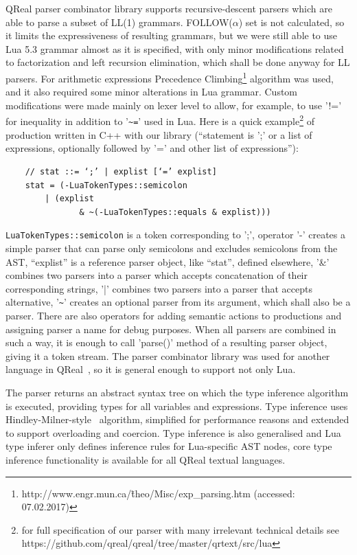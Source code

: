 \documentclass[conference]{IEEEtran}
\begin{document}
QReal parser combinator library supports recursive-descent parsers which are able to parse a subset of LL(1) grammars. FOLLOW($\alpha$) set is not calculated, so it limits the expressiveness of resulting grammars, but we were still able to use Lua 5.3 grammar almost as it is specified, with only minor modifications related to factorization and left recursion elimination, which shall be done anyway for LL parsers. For arithmetic expressions Precedence Climbing\footnote{http://www.engr.mun.ca/\~theo/Misc/exp\_parsing.htm (accessed: 07.02.2017)} algorithm was used, and it also required some minor alterations in Lua grammar. Custom modifications were made mainly on lexer level to allow, for example, to use '!=' for inequality in addition to '\verb|~=|' used in Lua. Here is a quick example\footnote{for full specification of our parser with many irrelevant technical details see https://github.com/qreal/qreal/tree/master/qrtext/src/lua} of production written in C++ with our library (``statement is ';' or a list of expressions, optionally followed by '=' and other list of expressions''):
\begin{verbatim}
	// stat ::= ‘;’ | explist [‘=’ explist]
	stat = (-LuaTokenTypes::semicolon 
	    | (explist 
			   & ~(-LuaTokenTypes::equals & explist)))
\end{verbatim}

\verb|LuaTokenTypes::semicolon| is a token corresponding to ';', operator '-' creates a simple parser that can parse only semicolons and excludes semicolons from the AST, ``explist'' is a reference parser object, like ``stat'', defined elsewhere, '\&' combines two parsers into a parser which accepts concatenation of their corresponding strings, '|' combines two parsers into a parser that accepts alternative, '\verb|~|' creates an optional parser from its argument, which shall also be a parser. There are also operators for adding semantic actions to productions and assigning parser a name for debug purposes. When all parsers are combined in such a way, it is enough to call 'parse()' method of a resulting parser object, giving it a token stream. The parser combinator library was used for another language in QReal~\cite{tikhonova2015generation}, so it is general enough to support not only Lua.

The parser returns an abstract syntax tree on which the type inference algorithm is executed, providing types for all variables and expressions. Type inference uses Hindley-Milner-style~\cite{damas1982principal} algorithm, simplified for performance reasons and extended to support overloading and coercion. Type inference is also generalised and Lua type inferer only defines inference rules for Lua-specific AST nodes, core type inference functionality is available for all QReal textual languages.
\end{document}
